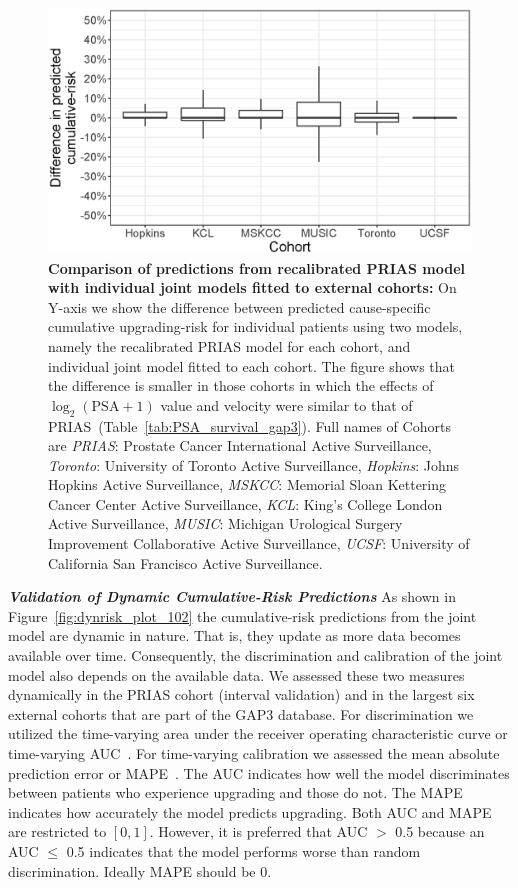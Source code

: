 \begin{figure}[!htb]
\centerline{\includegraphics[width=0.85\columnwidth]{images/calib_insmall_after.eps}}
\caption{\textbf{Comparison of predictions from recalibrated PRIAS model with individual joint models fitted to external cohorts:} On Y-axis we show the difference between predicted cause-specific cumulative upgrading-risk for individual patients using two models, namely the recalibrated PRIAS model for each cohort, and individual joint model fitted to each cohort. The figure shows that the difference is smaller in those cohorts in which the effects of $\log_2 (\mbox{PSA} + 1)$ value and velocity were similar to that of PRIAS~(Table~\ref{tab:PSA_survival_gap3}). Full names of Cohorts are \textit{PRIAS}: Prostate Cancer International Active Surveillance, \textit{Toronto}: University of Toronto Active Surveillance, \textit{Hopkins}: Johns Hopkins Active Surveillance, \textit{MSKCC}: Memorial Sloan Kettering Cancer Center Active Surveillance, \textit{KCL}: King's College London Active Surveillance, \textit{MUSIC}: Michigan Urological Surgery Improvement Collaborative Active Surveillance, \textit{UCSF}: University of California San Francisco Active Surveillance.}
\label{fig:calib_insmall_after}
\end{figure}

\clearpage
\textbf{\textit{Validation of Dynamic Cumulative-Risk Predictions}}
As shown in Figure~\ref{fig:dynrisk_plot_102} the cumulative-risk predictions from the joint model are dynamic in nature. That is, they update as more data becomes available over time. Consequently, the discrimination and calibration of the joint model also depends on the available data. We assessed these two measures dynamically in the PRIAS cohort (interval validation) and in the largest six external cohorts that are part of the GAP3 database. For discrimination we utilized the time-varying area under the receiver operating characteristic curve or time-varying AUC~\citep{rizopoulos2017dynamic}. For time-varying calibration we assessed the mean absolute prediction error or MAPE~\citep{rizopoulos2017dynamic}. The AUC indicates how well the model discriminates between patients who experience upgrading and those do not. The MAPE indicates how accurately the model predicts upgrading. Both AUC and MAPE are restricted to $[0,1]$. However, it is preferred that AUC $>$ 0.5 because an AUC $\leq$ 0.5 indicates that the model performs worse than random discrimination. Ideally MAPE should be 0.

